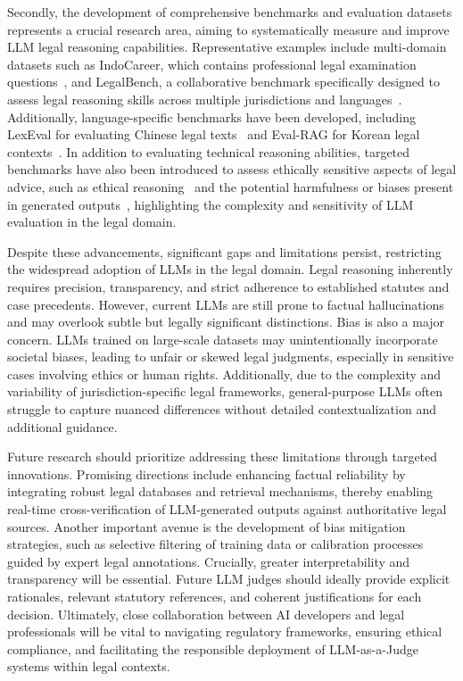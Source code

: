 Secondly, the development of comprehensive benchmarks and evaluation datasets represents a crucial research area, aiming to systematically measure and improve LLM legal reasoning capabilities. Representative examples include multi-domain datasets such as IndoCareer, which contains professional legal examination questions~\cite{koto2024cracking}, and LegalBench, a collaborative benchmark specifically designed to assess legal reasoning skills across multiple jurisdictions and languages~\cite{guha2024legalbench}. Additionally, language-specific benchmarks have been developed, including LexEval for evaluating Chinese legal texts~\cite{li2024lexeval} and Eval-RAG for Korean legal contexts~\cite{ryu2023retrieval}. In addition to evaluating technical reasoning abilities, targeted benchmarks have also been introduced to assess ethically sensitive aspects of legal advice, such as ethical reasoning~\cite{zhang2024evaluation} and the potential harmfulness or biases present in generated outputs~\cite{andriushchenko2024agentharm}, highlighting the complexity and sensitivity of LLM evaluation in the legal domain.

Despite these advancements, significant gaps and limitations persist, restricting the widespread adoption of LLMs in the legal domain. Legal reasoning inherently requires precision, transparency, and strict adherence to established statutes and case precedents. However, current LLMs are still prone to factual hallucinations and may overlook subtle but legally significant distinctions. Bias is also a major concern. LLMs trained on large-scale datasets may unintentionally incorporate societal biases, leading to unfair or skewed legal judgments, especially in sensitive cases involving ethics or human rights. Additionally, due to the complexity and variability of jurisdiction-specific legal frameworks, general-purpose LLMs often struggle to capture nuanced differences without detailed contextualization and additional guidance.

Future research should prioritize addressing these limitations through targeted innovations. Promising directions include enhancing factual reliability by integrating robust legal databases and retrieval mechanisms, thereby enabling real-time cross-verification of LLM-generated outputs against authoritative legal sources. Another important avenue is the development of bias mitigation strategies, such as selective filtering of training data or calibration processes guided by expert legal annotations. Crucially, greater interpretability and transparency will be essential. Future LLM judges should ideally provide explicit rationales, relevant statutory references, and coherent justifications for each decision. Ultimately, close collaboration between AI developers and legal professionals will be vital to navigating regulatory frameworks, ensuring ethical compliance, and facilitating the responsible deployment of LLM-as-a-Judge systems within legal contexts.


